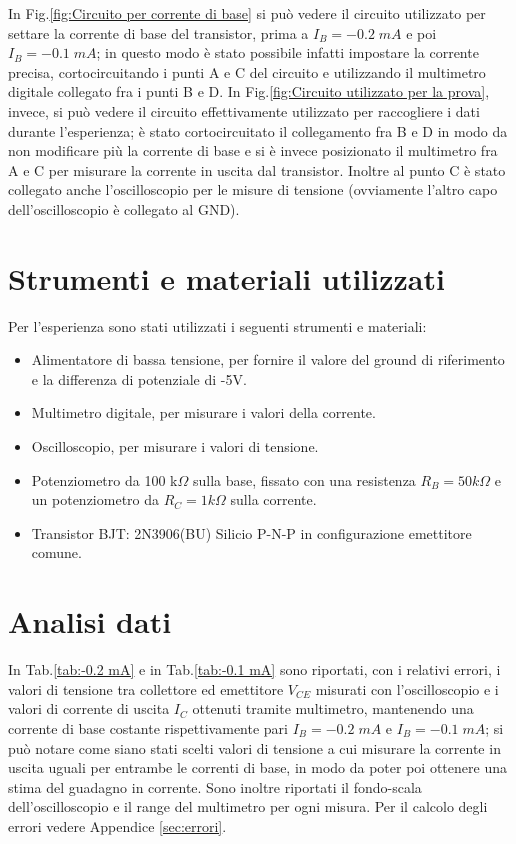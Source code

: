 \documentclass[a4paper, 11pt]{article}
\begin{document}
In Fig.\ref{fig:Circuito per corrente di base} si può vedere il circuito utilizzato per settare la corrente di base del transistor, prima a $I_B = -0.2 \; mA $ e poi $I_B = -0.1 \; mA$; in questo modo è stato possibile infatti impostare la corrente precisa, cortocircuitando i punti A e C del circuito e utilizzando il multimetro digitale collegato fra i punti B e D. In Fig.\ref{fig:Circuito utilizzato per la prova}, invece, si può vedere il circuito effettivamente utilizzato per raccogliere i dati durante l'esperienza; è stato cortocircuitato il collegamento fra B e D in modo da non modificare più la corrente di base e si è invece posizionato il multimetro fra A e C per misurare la corrente in uscita dal transistor. Inoltre al punto C è stato collegato anche l'oscilloscopio per le misure di tensione (ovviamente l'altro capo dell'oscilloscopio è collegato al GND).

\section{Strumenti e materiali utilizzati}
Per l'esperienza sono stati utilizzati i seguenti strumenti e materiali:
\begin{itemize}
    \item Alimentatore di bassa tensione, per fornire il valore del ground di riferimento e la differenza di potenziale di -5V.
    \item Multimetro digitale, per misurare i valori della corrente.
    \item Oscilloscopio, per misurare i valori di tensione.
    \item Potenziometro da 100 k$\Omega$ sulla base, fissato con una resistenza $R_B = 50 k\Omega$ e un potenziometro da $R_C = 1 k\Omega$ sulla corrente.
    \item Transistor BJT: 2N3906(BU) Silicio P-N-P in configurazione emettitore comune.
\end{itemize}


\section{Analisi dati}
In Tab.\ref{tab:-0.2 mA} e in Tab.\ref{tab:-0.1 mA} sono riportati, con i relativi errori, i valori di tensione tra collettore ed emettitore $V_{CE}$ misurati con l'oscilloscopio e i valori di corrente di uscita $I_C$ ottenuti tramite multimetro, mantenendo una corrente di base costante rispettivamente pari $I_B = -0.2 \;mA $ e $I_B = -0.1 \;mA $; si può notare come siano stati scelti valori di tensione a cui misurare la corrente in uscita uguali per entrambe le correnti di base, in modo da poter poi ottenere una stima del guadagno in corrente. Sono inoltre riportati il fondo-scala dell'oscilloscopio e il range del multimetro per ogni misura. Per il calcolo degli errori vedere Appendice \ref{sec:errori}.
\end{document}
